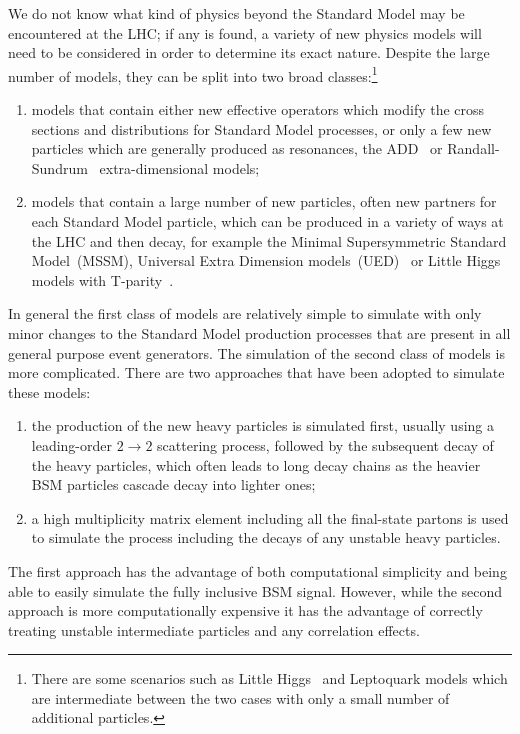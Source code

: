   We do not know what kind of physics beyond the Standard Model may be encountered
  at the LHC;  if any is found, a variety of new physics models will need to be considered in 
  order to determine its exact nature. Despite the large number of
  models, they can be split into two broad 
  classes:\footnote{There are some scenarios such as Little 
                    Higgs~\cite{ArkaniHamed:2002qx,ArkaniHamed:2002qy}
                    and Leptoquark models which are intermediate 
                    between the two cases with only a small number of
                    additional particles.}
\begin{enumerate}
\item models that contain either new effective operators which 
      modify the cross sections and distributions for Standard Model
      processes, or only a few new particles which are generally
      produced as resonances, \eg the 
      ADD~\cite{ArkaniHamed:1998rs,Antoniadis:1998ig} or
      Randall-Sundrum~\cite{Randall:1999ee} extra-dimensional models;
\item models that contain a large number of new particles, often new partners
      for each Standard Model particle, which can be produced in a variety of
      ways at the LHC and then decay, for example the Minimal Supersymmetric
      Standard Model~(MSSM), Universal Extra Dimension
      models~(UED)~\cite{Appelquist:2000nn,Cheng:2002ab} or
      Little Higgs models with T-parity~\cite{Low:2004xc,Hubisz:2004ft}.
\end{enumerate}
  In general the first class of models are relatively simple to simulate with only
  minor changes to the Standard Model production processes that are
  present in all general purpose event generators. The simulation of the second
  class of models is more complicated.
  There are two approaches that 
  have been adopted to simulate these models:
\begin{enumerate}
\item the production of the new heavy particles is simulated first, usually using a
      leading-order $2\to2$ scattering process, followed by the subsequent decay of
      the heavy particles, which often leads to long decay chains as the 
      heavier BSM particles cascade decay into lighter ones;
\item a high multiplicity matrix element including all the final-state partons
      is used to simulate the process including the decays of any unstable
      heavy particles.
\end{enumerate}
  The first approach has the advantage of both computational simplicity
  and being able to easily simulate the fully inclusive BSM signal. However,
  while the second approach is more computationally expensive it has the advantage
  of correctly treating unstable intermediate particles and any correlation effects.

